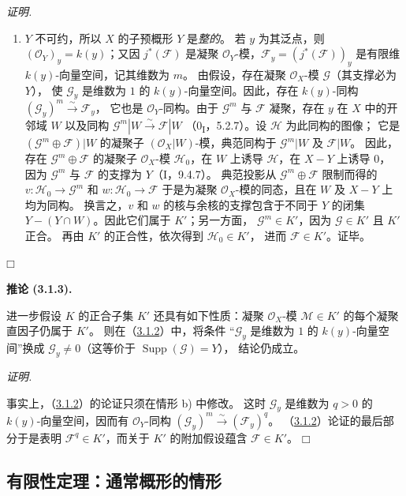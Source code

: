 \documentclass[UTF8,fontset=none,11pt,oneside,openany]{ctexbook}
\providecommand{\square}{\mdlgwhtsquare}
\newenvironment{corollary}[1][]{%
  \par\medskip\noindent\textbf{推论 (#1).}\ %
}{\par}
\newenvironment{proof}{%
  \par\smallskip\noindent\textit{证明.}\ %
}{\hfill$\square$\par}
\let\EGAOriginalLabel\label
\renewcommand{\label}[1]{\phantomsection\EGAOriginalLabel{#1}}
\begin{document}
\begin{proof}
\begin{enumerate}
\item[b)] $Y$ 不可约，所以 $X$ 的子预概形 $Y$ 是\emph{整的}。
若 $y$ 为其泛点，则 $(\mathcal O_Y)_y=k(y)$；又因 $j^*(\mathcal F)$
是凝聚 $\mathcal O_Y$-模，$\mathcal F_y=(j^*(\mathcal F))_y$
是有限维 $k(y)$-向量空间，记其维数为 $m$。
由假设，存在凝聚 $\mathcal O_X$-模 $\mathcal G$（其支撑必为 $Y$），
使 $\mathcal G_y$ 是维数为 $1$ 的 $k(y)$-向量空间。因此，存在
$k(y)$-同构 $(\mathcal G_y)^m\xrightarrow{\sim}\mathcal F_y$，
它也是 $\mathcal O_Y$-同构。由于 $\mathcal G^m$ 与 $\mathcal F$
凝聚，存在 $y$ 在 $X$ 中的开邻域 $W$ 以及同构
$\mathcal G^m|W\xrightarrow{\sim}\mathcal F|W$
（0\textsubscript{I}，5.2.7）。设 $\mathcal H$ 为此同构的图像；
它是 $(\mathcal G^m\oplus\mathcal F)|W$ 的凝聚子
$(\mathcal O_X|W)$-模，典范同构于 $\mathcal G^m|W$ 及 $\mathcal F|W$。
因此，存在 $\mathcal G^m\oplus\mathcal F$ 的凝聚子 $\mathcal O_X$-模
$\mathcal H_0$，在 $W$ 上诱导 $\mathcal H$，在 $X-Y$ 上诱导 $0$，
因为 $\mathcal G^m$ 与 $\mathcal F$ 的支撑为 $Y$（I，9.4.7）。
典范投影从 $\mathcal G^m\oplus\mathcal F$ 限制而得的
$v:\mathcal H_0\to\mathcal G^m$ 和 $w:\mathcal H_0\to\mathcal F$
于是为凝聚 $\mathcal O_X$-模的同态，且在 $W$ 及 $X-Y$ 上均为同构。
换言之，$v$ 和 $w$ 的核与余核的支撑包含于不同于 $Y$ 的闭集
$Y-(Y\cap W)$。因此它们属于 $K'$；另一方面，
$\mathcal G^m\in K'$，因为 $\mathcal G\in K'$ 且 $K'$ 正合。
再由 $K'$ 的正合性，依次得到 $\mathcal H_0\in K'$，
进而 $\mathcal F\in K'$。证毕。
\end{enumerate}
\end{proof}

\begin{corollary}[3.1.3]
\label{III.3.1.3-fr}
进一步假设 $K$ 的正合子集 $K'$ 还具有如下性质：凝聚
$\mathcal O_X$-模 $\mathcal M\in K'$ 的每个凝聚直因子仍属于 $K'$。
则在（\hyperref[III.3.1.2-fr]{3.1.2}）中，将条件
“$\mathcal G_y$ 是维数为 $1$ 的 $k(y)$-向量空间”换成
$\mathcal G_y\neq0$（这等价于 $\operatorname{Supp}(\mathcal G)=Y$），
结论仍成立。
\end{corollary}

\begin{proof}
事实上，（\hyperref[III.3.1.2-fr]{3.1.2}）的论证只须在情形 b) 中修改。
这时 $\mathcal G_y$ 是维数为 $q>0$ 的 $k(y)$-向量空间，因而有
$\mathcal O_Y$-同构
$(\mathcal G_y)^m\xrightarrow{\sim}(\mathcal F_y)^q$。
（\hyperref[III.3.1.2-fr]{3.1.2}）论证的最后部分于是表明
$\mathcal F^q\in K'$，而关于 $K'$ 的附加假设蕴含 $\mathcal F\in K'$。
\end{proof}

\subsection{有限性定理：通常概形的情形}
\label{subsection:III.3.2-fr}
\end{document}
